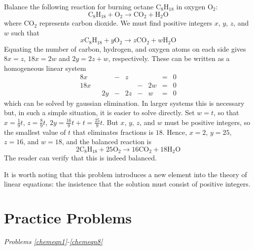 \documentclass{ximera}
\begin{document}
\begin{example}\label{001872}
Balance the following reaction for burning octane $\mbox{C}_8\mbox{H}_{18}$ in oxygen $\mbox{O}_2$:
\begin{equation*}
\mbox{C}_8\mbox{H}_{18} + \mbox{O}_2 \rightarrow \mbox{CO}_2 + \mbox{H}_2\mbox{O}
\end{equation*}
where $\mbox{CO}_2$ represents carbon dioxide. We must find positive integers $x$, $y$, $z$, and $w$ such that
\begin{equation*}
x\mbox{C}_8\mbox{H}_{18} + y\mbox{O}_2 \rightarrow z\mbox{CO}_2 + w\mbox{H}_2\mbox{O}
\end{equation*}
Equating the number of carbon, hydrogen, and oxygen atoms on each side gives $8x = z$, $18x = 2w$ and $2y = 2z + w$, respectively. These can be written as a homogeneous linear system
\begin{equation*}
\begin{array}{rlrlrlrcr}
 	 8x &   &   & - & z &   &   & = & 0 \\
	18x &   &   &   &   & - &2w & = & 0 \\
	    &   &2y & - &2z & - & w & = & 0
\end{array}
\end{equation*}
which can be solved by gaussian elimination. In larger systems this is
necessary but, in such a simple situation, it is easier to solve
directly. Set $w = t$, so that $x = \frac{1}{9}t$, $z = \frac{8}{9}t$, $2y = \frac{16}{9}t + t = \frac{25}{9}t$. But $x$, $y$, $z$, and $w$ must be positive integers, so the smallest value of $t$ that eliminates fractions is $18$. Hence, $x = 2$, $y = 25$, $z = 16$, and $w = 18$, and the balanced reaction is
\begin{equation*}
2\mbox{C}_8\mbox{H}_{18} + 25\mbox{O}_2 \rightarrow 16\mbox{CO}_2 + 18\mbox{H}_2\mbox{O}
\end{equation*}
The reader can verify that this is indeed balanced.
\end{example}

It is worth noting that this problem introduces a new element into the theory of linear equations: the insistence that the solution must consist of positive integers.

\section*{Practice Problems}

\emph{Problems \ref{chemeqn1}-\ref{chemeqn8}}
\end{document}
